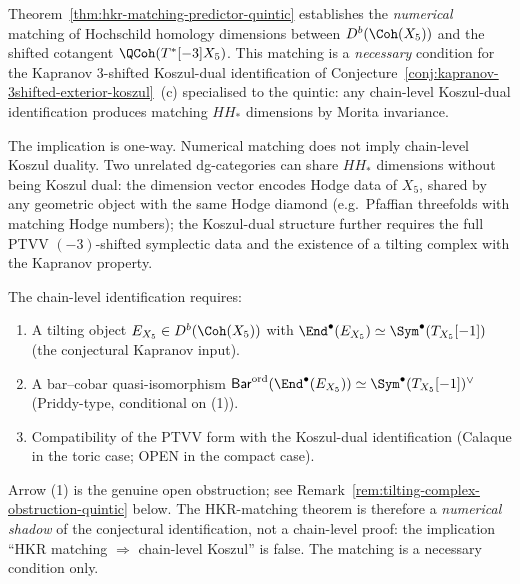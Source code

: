 \begin{remark}
\label{rem:hkr-matching-not-koszul-duality}
Theorem~\ref{thm:hkr-matching-predictor-quintic} establishes the
\emph{numerical} matching of Hochschild homology dimensions between
$D^b(\Coh(X_5))$ and the shifted cotangent $\QCoh(T^*[-3]X_5)$. This
matching is a \emph{necessary} condition for the Kapranov $3$-shifted
Koszul-dual identification of
Conjecture~\ref{conj:kapranov-3shifted-exterior-koszul}~(c) specialised
to the quintic: any chain-level Koszul-dual identification produces
matching $HH_*$ dimensions by Morita invariance.

The implication is one-way. Numerical matching does not imply
chain-level Koszul duality. Two unrelated dg-categories can share
$HH_*$ dimensions without being Koszul dual: the dimension vector
encodes Hodge data of $X_5$, shared by any geometric object
with the same Hodge diamond (e.g.\ Pfaffian threefolds with matching
Hodge numbers); the Koszul-dual structure further requires the
full PTVV $(-3)$-shifted symplectic data and the existence of a
tilting complex with the Kapranov property.

The chain-level identification requires:
\begin{enumerate}[label=\textup{(\arabic*)}]
 \item A tilting object $E_{X_5}\in D^b(\Coh(X_5))$ with
 $\End^\bullet(E_{X_5})\simeq \Sym^\bullet(T_{X_5}[-1])$
 (the conjectural Kapranov input).
 \item A bar--cobar quasi-isomorphism
 $\mathsf{Bar}^{\mathrm{ord}}(\End^\bullet(E_{X_5}))\simeq
 \Sym^\bullet(T_{X_5}[-1])^\vee$ (Priddy-type, conditional on (1)).
 \item Compatibility of the PTVV form with the Koszul-dual identification
 (Calaque \cite{Calaque2015} in the toric case; OPEN in the compact case).
\end{enumerate}
Arrow (1) is the genuine open obstruction; see
Remark~\ref{rem:tilting-complex-obstruction-quintic} below.
The HKR-matching theorem is therefore a \emph{numerical shadow} of the
conjectural identification, not a chain-level proof: the implication
``HKR matching $\Rightarrow$ chain-level Koszul'' is false. The
matching is a necessary condition only.
\end{remark}

